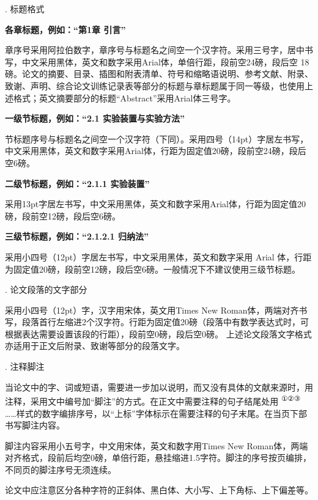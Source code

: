 \documentclass{Diploma}
\begin{document}
\begin{}
. 标题格式

\textbf{各章标题，例如：“第1章 引言”}

章序号采用阿拉伯数字，章序号与标题名之间空一个汉字符。采用三号字，居中书写，中文采用黑体，英文和数字采用Arial体，单倍行距，段前空24磅，段后空 18 磅。论文的摘要、目录、插图和附表清单、符号和缩略语说明、参考文献、附录、致谢、声明、综合论文训练记录表等部分的标题与章标题属于同一等级，也使用上述格式；英文摘要部分的标题“Abstract”采用Arial体三号字。

\textbf{一级节标题，例如：“2.1 实验装置与实验方法”}

节标题序号与标题名之间空一个汉字符（下同）。采用四号（14pt）字居左书写，中文采用黑体，英文和数字采用Arial体，行距为固定值20磅，段前空24磅，段后空6磅。

\textbf{二级节标题，例如：“2.1.1 实验装置”}

采用13pt字居左书写，中文采用黑体，英文和数字采用Arial体，行距为固定值20磅，段前空12磅，段后空6磅。

\textbf{三级节标题，例如：“2.1.2.1 归纳法”}

采用小四号（12pt）字居左书写，中文采用黑体，英文和数字采用 Arial 体，行距为固定值20磅，段前空12磅，段后空6磅。一般情况下不建议使用三级节标题。

. 论文段落的文字部分

采用小四号（12pt）字，汉字用宋体，英文用Times New Roman体，两端对齐书写，段落首行左缩进2个汉字符。行距为固定值20磅（段落中有数学表达式时，可根据表达需要设置该段的行距），段前空0磅，段后空0磅。
上述论文段落文字格式亦适用于正文后附录、致谢等部分的段落文字。

. 注释脚注

当论文中的字、词或短语，需要进一步加以说明，而又没有具体的文献来源时，用注释，采用文中编号加“脚注”的方式。在正文中需要注释的句子结尾处用%
\begingroup\setmainfont{SimSun}\textsuperscript{①②③}\endgroup
……样式的数字编排序号，以“上标”字体标示在需要注释的句子末尾。在当页下部书写脚注内容。

脚注内容采用小五号字，中文用宋体，英文和数字用Times New Roman体，两端对齐格式，段前后均空0磅，单倍行距，悬挂缩进1.5字符。脚注的序号按页编排，不同页的脚注序号无须连续。

论文中应注意区分各种字符的正斜体、黑白体、大小写、上下角标、上下偏差等。


\end{}
\end{document}
